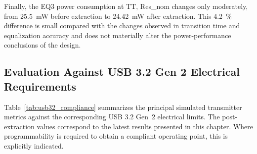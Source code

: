 Finally, the EQ3 power consumption at \ac{TT}, Res\_nom changes only moderately, from \SI{25.5}{\milli\watt} before extraction to \SI{24.42}{\milli\watt} after extraction. This \SI{4.2}{\percent} difference is small compared with the changes observed in transition time and equalization accuracy and does not materially alter the power-performance conclusions of the design.

\subsection{Evaluation Against USB 3.2 Gen 2 Electrical Requirements}\label{sec:usb32_compliance}

Table~\ref{tab:usb32_compliance} summarizes the principal simulated transmitter metrics against the corresponding \ac{USB} 3.2 Gen~2 electrical limits. The post-extraction values correspond to the latest results presented in this chapter. Where programmability is required to obtain a compliant operating point, this is explicitly indicated.


